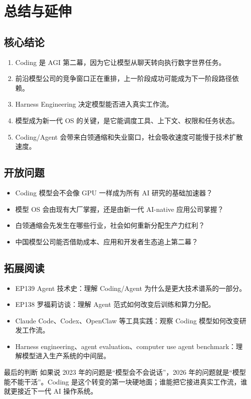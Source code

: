 \section{总结与延伸}

\subsection{核心结论}

\begin{enumerate}
\item Coding 是 AGI 第二幕，因为它让模型从聊天转向执行数字世界任务。
\item 前沿模型公司的竞争窗口正在重排，上一阶段成功可能成为下一阶段路径依赖。
\item Harness Engineering 决定模型能否进入真实工作流。
\item 模型成为新一代 OS 的关键，是它能调度工具、上下文、权限和任务状态。
\item Coding/Agent 会带来白领通缩和失业窗口，社会吸收速度可能慢于技术扩散速度。
\end{enumerate}

\subsection{开放问题}

\begin{itemize}
\item Coding 模型会不会像 GPU 一样成为所有 AI 研究的基础加速器？
\item 模型 OS 会由现有大厂掌握，还是由新一代 AI-native 应用公司掌握？
\item 白领通缩会先发生在哪些行业，社会如何重新分配生产力红利？
\item 中国模型公司能否借助成本、应用和开发者生态追上第二幕？
\end{itemize}

\subsection{拓展阅读}

\begin{itemize}
\item EP139 Agent 技术史：理解 Coding/Agent 为什么是更大技术谱系的一部分。
\item EP138 罗福莉访谈：理解 Agent 范式如何改变后训练和算力分配。
\item Claude Code、Codex、OpenClaw 等工具实践：观察 Coding 模型如何改变研发工作流。
\item Harness engineering、agent evaluation、computer use agent benchmark：理解模型进入生产系统的中间层。
\end{itemize}

\begin{importantbox}{最后的判断}
如果说 2023 年的问题是“模型会不会说话”，2026 年的问题就是“模型能不能干活”。Coding 是这个转变的第一块硬地面；谁能把它接进真实工作流，谁就更接近下一代 AI 操作系统。
\end{importantbox}


